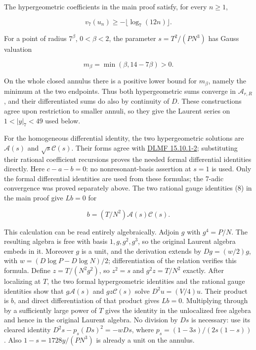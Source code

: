 \documentclass[11pt,a4paper]{article}
\begin{document}
The hypergeometric coefficients in the main proof satisfy, for every \(n≥1\),

\[
v_7(u_n)\ge-\lfloor\log_7(12n)\rfloor.
\]

For a point of radius \(7^β\), \(0<β<2\), the parameter \(s=T^{2}/(PN^{3})\) has Gauss valuation

\[
m_\beta=\min(\beta,14-7\beta)>0.
\]

On the whole closed annulus there is a positive lower bound for \(m_β\), namely the minimum at the two endpoints. Thus both hypergeometric sums converge in \(\mathcal{A}_{r,R}\), and their differentiated sums do also by continuity of \(D\). These constructions agree upon restriction to smaller annuli, so they give the Laurent series on \(1<|y|_{7}<49\) used below.

For the homogeneous differential identity, the two hypergeometric solutions are \(\mathcal{A}(s)\) and \(\surd s \mathcal{C}(s)\). Their forms agree with \href{https://dlmf.nist.gov/15.10}{DLMF 15.10.1-2}; substituting their rational coefficient recursions proves the needed formal differential identities directly. Here \(c-a-b=0\): no nonresonant-basis assertion at \(s=1\) is used. Only the formal differential identities are used from these formulas; the 7-adic convergence was proved separately above. The two rational gauge identities (8) in the main proof give \(Lb=0\) for

\[
b=(T/N^2)\mathcal A(s)\mathcal C(s).
\]

This calculation can be read entirely algebraically. Adjoin \(g\) with \(g^{4}=P/N\). The resulting algebra is free with basis \(1,g,g^{2},g^{3}\), so the original Laurent algebra embeds in it. Moreover \(g\) is a unit, and the derivation extends by \(Dg=(w/2)g\), with \(w=(D \operatorname{log} P-D \operatorname{log} N)/2\); differentiation of the relation verifies this formula. Define \(z=T/(N^{2}g^{2})\), so \(z^{2}=s\) and \(g^{2}z=T/N^{2}\) exactly. After localizing at \(T\), the two formal hypergeometric identities and the rational gauge identities show that \(g\mathcal{A}(s)\) and \(gz\mathcal{C}(s)\) solve \(D^{2}u=(V/4)u\). Their product is \(b\), and direct differentiation of that product gives \(Lb=0\). Multiplying through by a sufficiently large power of \(T\) gives the identity in the unlocalized free algebra and hence in the original Laurent algebra. No division by \(Ds\) is necessary: use its cleared identity \(D^{2}s-p_s(Ds)^{2}=-wDs\), where \(p_s=(1-3s)/(2s(1-s))\). Also \(1-s=1728y/(PN^{3})\) is already a unit on the annulus.
\end{document}
